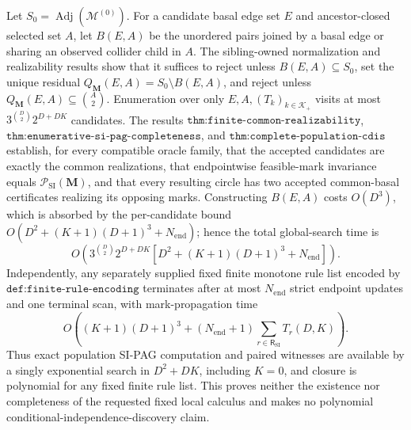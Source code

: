 Let \(S_0=\operatorname{Adj}(\mathcal M^{(0)})\). For a candidate basal edge set \(E\) and ancestor-closed selected set \(A\), let \(B(E,A)\) be the unordered pairs joined by a basal edge or sharing an observed collider child in \(A\). The sibling-owned normalization and realizability results show that it suffices to reject unless \(B(E,A)\subseteq S_0\), set the unique residual \(Q_{\mathbf M}(E,A)=S_0\setminus B(E,A)\), and reject unless \(Q_{\mathbf M}(E,A)\subseteq\binom A2\). Enumeration over only \(E,A,(T_k)_{k\in\mathcal K_+}\) visits at most \(3^{\binom D2}2^{D+DK}\) candidates. The results \(\texttt{thm:finite-common-realizability}\), \(\texttt{thm:enumerative-si-pag-completeness}\), and \(\texttt{thm:complete-population-cdis}\) establish, for every compatible oracle family, that the accepted candidates are exactly the common realizations, that endpointwise feasible-mark invariance equals \(\mathcal P_{\mathrm{SI}}(\mathbf M)\), and that every resulting circle has two accepted common-basal certificates realizing its opposing marks. Constructing \(B(E,A)\) costs \(O(D^3)\), which is absorbed by the per-candidate bound \(O(D^2+(K+1)(D+1)^3+N_{\mathrm{end}})\); hence the total global-search time is
\[O\!\left(3^{\binom D2}2^{D+DK}\left[D^2+(K+1)(D+1)^3+N_{\mathrm{end}}\right]\right).\]
Independently, any separately supplied fixed finite monotone rule list encoded by \(\texttt{def:finite-rule-encoding}\) terminates after at most \(N_{\mathrm{end}}\) strict endpoint updates and one terminal scan, with mark-propagation time
\[O\!\left((K+1)(D+1)^3+(N_{\mathrm{end}}+1)\sum_{r\in\mathsf R_{\mathrm{SI}}}T_r(D,K)\right).\]
Thus exact population SI-PAG computation and paired witnesses are available by a singly exponential search in \(D^2+DK\), including \(K=0\), and closure is polynomial for any fixed finite rule list. This proves neither the existence nor completeness of the requested fixed local calculus and makes no polynomial conditional-independence-discovery claim.